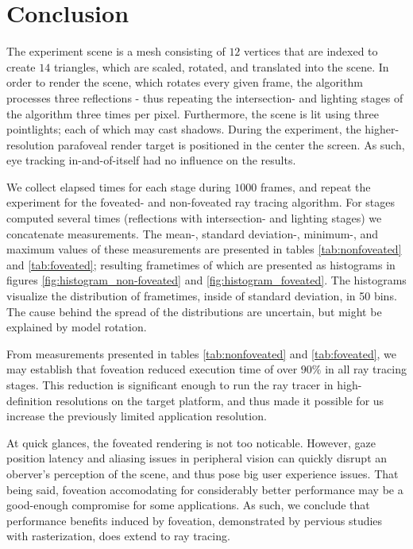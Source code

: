 
\section{Conclusion}
The experiment scene is a mesh consisting of $12$ vertices that are indexed to create $14$ triangles, which are scaled, rotated, and translated into the scene.
In order to render the scene, which rotates every given frame, the algorithm processes three reflections - thus repeating the intersection- and lighting stages of the algorithm three times per pixel.
Furthermore, the scene is lit using three pointlights; each of which may cast shadows.
During the experiment, the higher-resolution parafoveal render target is positioned in the center the screen.
As such, eye tracking in-and-of-itself had no influence on the results.

We collect elapsed times for each stage during $1000$ frames, and repeat the experiment for the foveated- and non-foveated ray tracing algorithm.
For stages computed several times (reflections with intersection- and lighting stages) we concatenate measurements.
The mean-, standard deviation-, minimum-, and maximum values of these measurements are presented in tables \ref{tab:nonfoveated} and \ref{tab:foveated}; resulting frametimes of which are presented as histograms in figures \ref{fig:histogram_non-foveated} and \ref{fig:histogram_foveated}.
The histograms visualize the distribution of frametimes, inside of standard deviation, in 50 bins.
The cause behind the spread of the distributions are uncertain, but might be explained by model rotation.

From measurements presented in tables \ref{tab:nonfoveated} and \ref{tab:foveated}, we may establish that foveation reduced execution time of over $90\%$ in all ray tracing stages.
This reduction is significant enough to run the ray tracer in high-definition resolutions on the target platform, and thus made it possible for us increase the previously limited application resolution.

At quick glances, the foveated rendering is not too noticable.
However, gaze position latency and aliasing issues in peripheral vision can quickly disrupt an oberver's perception of the scene, and thus pose big user experience issues.
That being said, foveation accomodating for considerably better performance may be a good-enough compromise for some applications.
As such, we conclude that performance benefits induced by foveation, demonstrated by pervious studies~\cite{guenter12} with rasterization, does extend to ray tracing.

